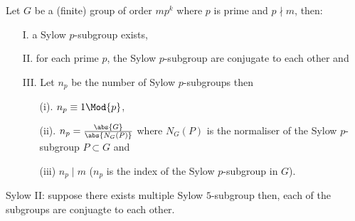 \documentclass[12pt, a4paper]{article}
\begin{document}
\begin{mdthm}
    Let \(G\) be a (finite) group of order \(mp^k\) where \(p\) is prime and \(p \nmid m\), then:
    \begin{itemize}
        \item[I.] a Sylow \(p\)-subgroup exists,
        \item[II.] for each prime \(p\), the Sylow \(p\)-subgroup are conjugate to each other and
        \item[III.]  Let \(n_p\) be the number of Sylow \(p\)-subgroups then 
        \begin{enumerate}
            \item[(i).] \(n_p \equiv 1 \Mod{p}\),
            \item[(ii).] \(n_p = \frac{\abs{G}}{\abs{N_G(P)}}\) where \(N_G(P)\) is the normaliser of the Sylow \(p\)-subgroup \(P \subset G\) and 
            \item[(iii)] \(n_p \mid m\) (\(n_p\) is the index of the Sylow \(p\)-subgroup in \(G\)).
        \end{enumerate}
    \end{itemize}
\end{mdthm}

\begin{mdremark}
    Sylow II: suppose there exists multiple Sylow $5$-subgroup then, each of the subgroups are conjuagte to each other.
\end{mdremark}
\end{document}

